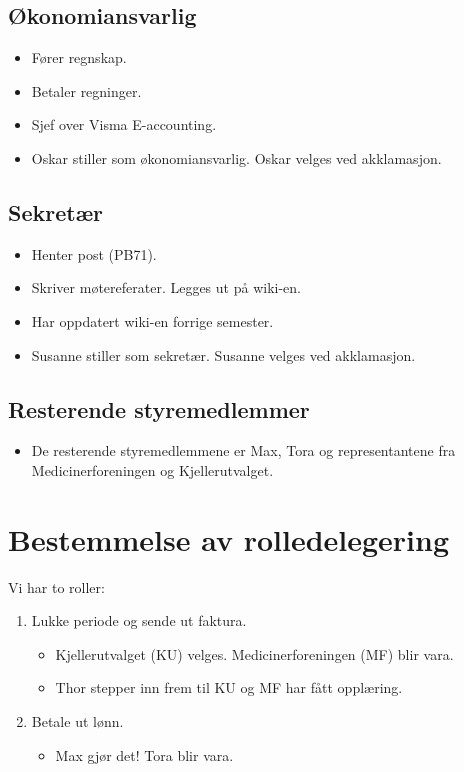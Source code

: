 \documentclass{article}[12pt]
\begin{document}
    \subsection{Økonomiansvarlig}
        \begin{itemize}
            \item Fører regnskap.
            \item Betaler regninger.
            \item Sjef over Visma E-accounting.
            \item Oskar stiller som økonomiansvarlig.
                  Oskar velges ved akklamasjon.
        \end{itemize}

    \subsection{Sekretær}
        \begin{itemize}
            \item Henter post (PB71).
            \item Skriver møtereferater. Legges ut på wiki-en.
            \item Har oppdatert wiki-en forrige semester.
            \item Susanne stiller som sekretær. 
                  Susanne velges ved akklamasjon. 
        \end{itemize}

    \subsection{Resterende styremedlemmer}
        \begin{itemize}
            \item De resterende styremedlemmene er Max, Tora
                  og representantene fra Medicinerforeningen og 
                  Kjellerutvalget.
        \end{itemize}

\section{Bestemmelse av rolledelegering}
    Vi har to roller:
    \begin{enumerate}
        \item Lukke periode og sende ut faktura.
        \begin{itemize}
            \item Kjellerutvalget (KU) velges. 
                  Medicinerforeningen (MF) blir vara.
            \item Thor stepper inn frem til KU og MF har fått opplæring.
        \end{itemize}
        \item Betale ut lønn.
        \begin{itemize}
            \item Max gjør det! Tora blir vara.
        \end{itemize}
    \end{enumerate}
\end{document}
